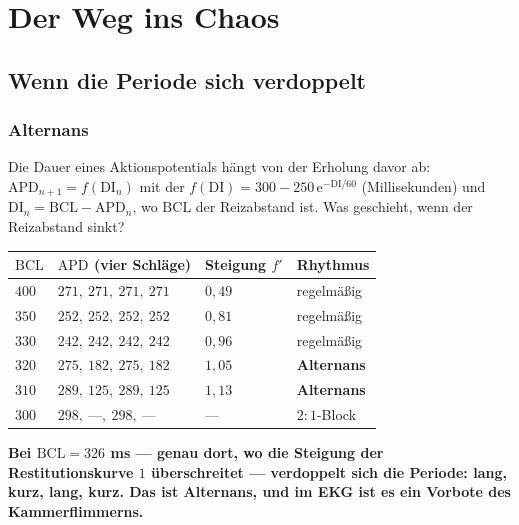 \part{Der Weg ins Chaos}

\chapter{Wenn die Periode sich verdoppelt}

\section{Alternans}

\begin{merksatz}
Die Dauer eines Aktionspotentials hängt von der Erholung davor ab: $\mathrm{APD}_{n+1} = f(\mathrm{DI}_n)$ mit der  $f(\mathrm{DI}) = 300 - 250\,\mathrm e^{-\mathrm{DI}/60}$ (Millisekunden) und $\mathrm{DI}_n = \mathrm{BCL} - \mathrm{APD}_n$, wo $\mathrm{BCL}$ der Reizabstand ist. Was geschieht, wenn der Reizabstand sinkt?

\begin{center}
{\small
\renewcommand{\arraystretch}{1.46}
\begin{tabular}{@{}P{1.4cm}P{3.6cm}P{1.6cm}P{2.4cm}@{}}
\toprule
$\mathrm{BCL}$ & $\mathrm{APD}$ (vier Schläge) & \textbf{Steigung $f'$} & \textbf{Rhythmus}\\
\midrule
$400$ & $271,\ 271,\ 271,\ 271$ & $0{,}49$ & regelmäßig\\
$350$ & $252,\ 252,\ 252,\ 252$ & $0{,}81$ & regelmäßig\\
$330$ & $242,\ 242,\ 242,\ 242$ & $0{,}96$ & regelmäßig\\
$320$ & $275,\ 182,\ 275,\ 182$ & $1{,}05$ & \textbf{Alternans}\\
$310$ & $289,\ 125,\ 289,\ 125$ & $1{,}13$ & \textbf{Alternans}\\
$300$ & $298,\ \text{---},\ 298,\ \text{---}$ & --- & $2\!:\!1$-Block\\
\bottomrule
\end{tabular}}
\end{center}

\begin{center}
\begin{minipage}{0.9\textwidth}
\textbf{Bei $\mathrm{BCL} = 326$ ms --- genau dort, wo die Steigung der Restitutionskurve $1$ überschreitet --- verdoppelt sich die Periode: lang, kurz, lang, kurz. Das ist Alternans, und im EKG ist es ein Vorbote des Kammerflimmerns.}
\end{minipage}
\end{center}


\end{merksatz}
